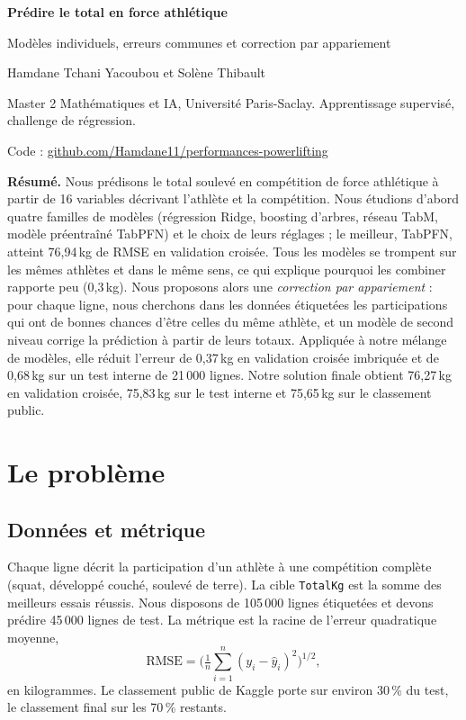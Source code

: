 \documentclass[11pt,a4paper]{article}
\newcommand{\code}[1]{\texttt{\small #1}}
\newcommand{\kg}{\,kg}
\begin{document}
\begin{center}
{\LARGE\bfseries\color{navy}Prédire le total en force athlétique}\par
\vspace{3pt}
{\large Modèles individuels, erreurs communes et correction par appariement}\par
\vspace{5pt}
Hamdane Tchani Yacoubou et Solène Thibault\par
{\small Master 2 Mathématiques et IA, Université Paris-Saclay. Apprentissage supervisé, challenge de régression.}\par
{\small Code : \href{https://github.com/Hamdane11/performances-powerlifting}{github.com/Hamdane11/performances-powerlifting}}
\end{center}

\noindent\textbf{Résumé.} Nous prédisons le total soulevé en compétition de force athlétique à partir de
16 variables décrivant l'athlète et la compétition. Nous étudions d'abord quatre familles de modèles
(régression Ridge, boosting d'arbres, réseau TabM, modèle préentraîné TabPFN) et le choix de leurs
réglages ; le meilleur, TabPFN, atteint 76,94\kg{} de RMSE en validation croisée. Tous les modèles se
trompent sur les mêmes athlètes et dans le même sens, ce qui explique pourquoi les combiner rapporte peu
(0,3\kg). Nous proposons alors une \emph{correction par appariement} : pour chaque ligne, nous
cherchons dans les données étiquetées les participations qui ont de bonnes chances d'être celles du même
athlète, et un modèle de second niveau corrige la prédiction à partir de leurs totaux. Appliquée à notre
mélange de modèles, elle réduit l'erreur de 0,37\kg{} en validation croisée imbriquée et de 0,68\kg{} sur un
test interne de 21\,000 lignes. Notre solution finale obtient 76,27\kg{} en validation croisée, 75,83\kg{}
sur le test interne et 75,65\kg{} sur le classement public.

\section{Le problème}\label{sec:probleme}

\subsection{Données et métrique}
Chaque ligne décrit la participation d'un athlète à une compétition complète (squat, développé couché,
soulevé de terre). La cible \code{TotalKg} est la somme des meilleurs essais réussis. Nous disposons de
105\,000 lignes étiquetées et devons prédire 45\,000 lignes de test. La métrique est la racine de
l'erreur quadratique moyenne,
\[
\mathrm{RMSE} = \Big(\tfrac1n \textstyle\sum_{i=1}^n (y_i - \hat y_i)^2\Big)^{1/2},
\]
en kilogrammes. Le classement public de Kaggle porte sur environ 30\,\% du test, le classement final sur
les 70\,\% restants.
\end{document}
